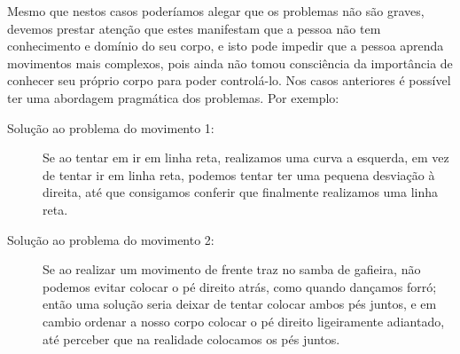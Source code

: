 Mesmo que nestos casos poderíamos alegar que os problemas não são graves,
devemos prestar atenção que estes manifestam que a pessoa não tem conhecimento e domínio do seu corpo,
e isto pode impedir que a pessoa aprenda movimentos mais complexos,
pois ainda não tomou consciência da importância de conhecer seu próprio corpo para poder controlá-lo.
Nos casos anteriores é possível ter uma abordagem pragmática dos problemas.
Por exemplo:
\begin{description}
\item[Solução ao problema do movimento 1:] Se ao tentar em ir em linha reta, realizamos uma curva a esquerda,
em vez de tentar ir em linha reta, podemos tentar ter uma pequena desviação à direita,
até que consigamos conferir que finalmente realizamos uma linha reta.
\item[Solução ao problema do movimento 2:] Se ao realizar um movimento de frente traz no samba de gafieira,
não podemos evitar colocar o pé direito atrás,
como quando dançamos forró; 
então uma solução seria deixar de tentar colocar ambos pés juntos,
e em cambio ordenar a nosso corpo colocar o pé direito ligeiramente adiantado,
até perceber que na realidade colocamos os pés juntos.
\end{description} 


